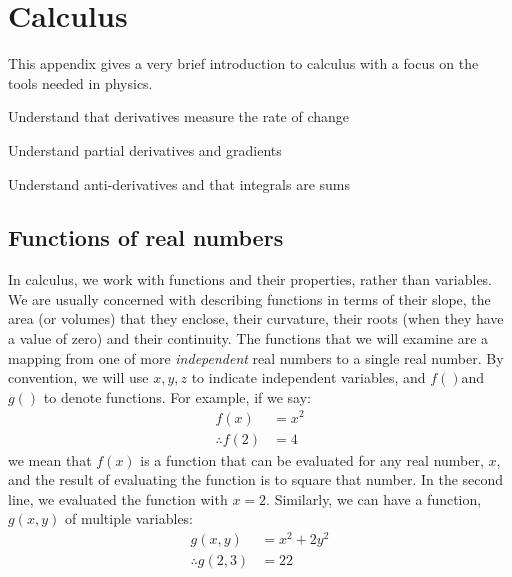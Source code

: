 %
\chapter{Calculus}
\label{app:calculus}
This appendix gives a very brief introduction to calculus with a focus on the tools needed in physics. 
 \vspace{1cm}
\begin{learningObjectives}
\item Understand that derivatives measure the rate of change
\item Understand partial derivatives and gradients
\item Understand anti-derivatives and that integrals are sums
\end{learningObjectives}

\section{Functions of real numbers}
In calculus, we work with functions and their properties, rather than variables. We are usually concerned with describing functions in terms of their slope, the area (or volumes) that they enclose, their curvature, their roots (when they have a value of zero) and their continuity. The functions that we will examine are a mapping from one of more \textit{independent} real numbers to a single real number. By convention, we will use $x,y,z$ to indicate independent variables, and $f() $and $g()$ to denote functions. For example, if we say:
\begin{align*}
f(x) &= x^2\\
\therefore f(2) &= 4
\end{align*}
we mean that $f(x)$ is a function that can be evaluated for any real number, $x$, and the result of evaluating the function is to square that number. In the second line, we evaluated the function with $x=2$. Similarly, we can have a function, $g(x,y)$ of multiple variables:
\begin{align*}
g(x,y)&=x^2+2y^2\\
\therefore g(2,3)&=22
\end{align*}

